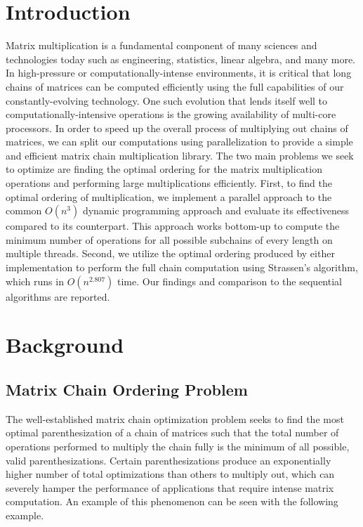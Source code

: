 \documentclass[conference,leqno]{IEEEtran}
\begin{document}
\section{Introduction}
Matrix multiplication is a fundamental component of many sciences and technologies today such as engineering, statistics, linear algebra, and many more. In high-pressure or computationally-intense environments, it is critical that long chains of matrices can be computed efficiently using the full capabilities of our constantly-evolving technology. One such evolution that lends itself well to computationally-intensive operations is the growing availability of multi-core processors. In order to speed up the overall process of multiplying out chains of matrices, we can split our computations using parallelization to provide a simple and efficient matrix chain multiplication library.
The two main problems we seek to optimize are finding the optimal ordering for the matrix multiplication operations and performing large multiplications efficiently. First, to find the optimal ordering of multiplication, we implement a parallel approach to the common $O(n^3)$ dynamic programming approach and evaluate its effectiveness compared to its counterpart. This approach works bottom-up to compute the minimum number of operations for all possible subchains of every length on multiple threads. Second, we utilize the optimal ordering produced by either implementation to perform the full chain computation using Strassen's algorithm, which runs in $O(n^{2.807})$ time. Our findings and comparison to the sequential algorithms are reported.

\section{Background}
\subsection{Matrix Chain Ordering Problem}
The well-established matrix chain optimization problem seeks to find the most optimal parenthesization of a chain of matrices such that the total number of operations performed to multiply the chain fully is the minimum of all possible, valid parenthesizations. Certain parenthesizations produce an exponentially higher number of total optimizations than others to multiply out, which can severely hamper the performance of applications that require intense matrix computation. An example of this phenomenon can be seen with the following example.
\end{document}

